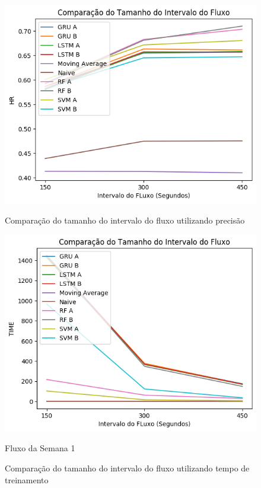 \begin{figure}[htbp]
    \centering
    \includegraphics[scale=0.8]{monography/img/comparisons/comparacao_do_tamanho_do_intervalo_do_fluxo_hr.png}
    \label{figure:tamanho_do_intervalo_do_fluxo_hr}
    \caption{Comparação do tamanho do intervalo do fluxo utilizando precisão}
\end{figure}

\begin{figure}[htbp]
    \centering
    \includegraphics[scale=0.8]{monography/img/comparisons/comparacao_do_tamanho_do_intervalo_do_fluxo_time.png}
    \label{figure:tamanho_do_intervalo_do_fluxo_time}
    \caption{Fluxo da Semana 1}
    \caption{Comparação do tamanho do intervalo do fluxo utilizando tempo de treinamento}
\end{figure}
